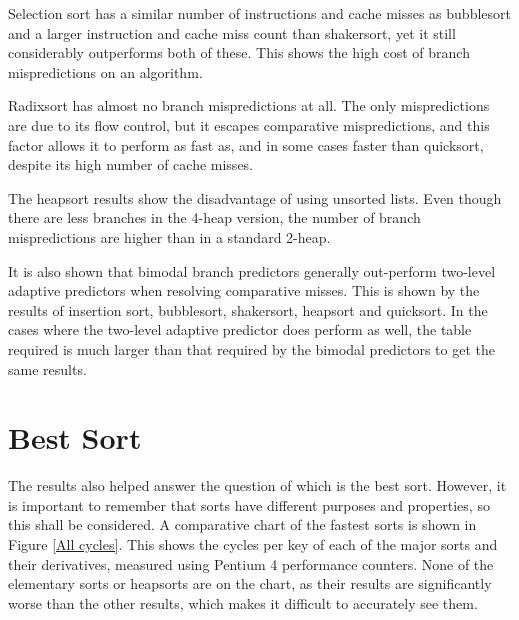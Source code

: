 Selection sort has a similar number of instructions and cache misses as
bubblesort and a larger instruction and cache miss count than shakersort, yet it
still considerably outperforms both of these. This shows the high cost of branch
mispredictions on an algorithm.

Radixsort has almost no branch mispredictions at all. The only mispredictions
are due to its flow control, but it escapes comparative mispredictions, and this
factor allows it to perform as fast as, and in some cases faster than quicksort,
despite its high number of cache misses.

The heapsort results show the disadvantage of using unsorted lists. Even though
there are less branches in the 4-heap version, the number of branch
mispredictions are higher than in a standard 2-heap.

It is also shown that bimodal branch predictors generally out-perform two-level
adaptive predictors when resolving comparative misses. This is shown by the
results of insertion sort, bubblesort, shakersort, heapsort and quicksort. In
the cases where the two-level adaptive predictor does perform as well, the table
required is much larger than that required by the bimodal predictors to get the
same results.

\section{Best Sort}
The results also helped answer the question of which is the best sort. However,
it is important to remember that sorts have different purposes and properties,
so this shall be considered. A comparative chart of the fastest sorts is shown
in Figure \ref{All cycles}. This shows the cycles per key of each of the major
sorts and their derivatives, measured using Pentium 4 performance counters.
None of the elementary sorts or heapsorts are on the chart, as their results
are significantly worse than the other results, which makes it difficult to
accurately see them.

